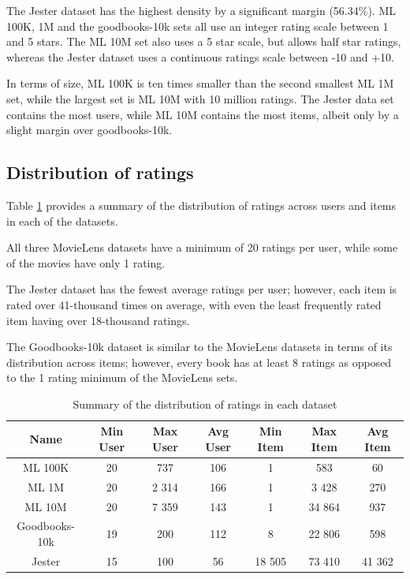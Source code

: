The Jester dataset has the highest density by a significant margin (56.34\%). ML 100K, 1M and the goodbooks-10k sets all use an integer rating scale between 1 and 5 stars. The ML 10M set also uses a 5 star scale, but allows half star ratings, whereas the Jester dataset uses a continuous ratings scale between -10 and +10.

In terms of size, ML 100K is ten times smaller than the second smallest ML 1M set, while the largest set is ML 10M with 10 million ratings. The Jester data set contains the most users, while ML 10M contains the most items, albeit only by a slight margin over goodbooks-10k.

\subsection{Distribution of ratings}
Table \ref{tab:ratings-distribution} provides a summary of the distribution of ratings across users and items in each of the datasets.

All three MovieLens datasets have a minimum of 20 ratings per user, while some of the movies have only 1 rating.

The Jester dataset has the fewest average ratings per user; however, each item is rated over 41-thousand times on average, with even the least frequently rated item having over 18-thousand ratings.

The Goodbooks-10k dataset is similar to the MovieLens datasets in terms of its distribution across items; however, every book has at least 8 ratings as opposed to the 1 rating minimum of the MovieLens sets.

\begin{table}[H]
\label{tab:ratings-distribution}
\centering
\begin{tabular}{c | c | c | c | c | c | c}
\toprule
\textbf{Name} & \textbf{Min User} & \textbf{Max User} & \textbf{Avg User} & \textbf{Min Item} & \textbf{Max Item} & \textbf{Avg Item} \\
\midrule
ML 100K & 20 & 737 & 106 & 1 & 583 & 60 \\
ML 1M & 20 & 2 314 & 166 & 1 & 3 428 & 270 \\
ML 10M & 20 & 7 359 & 143 & 1 & 34 864 & 937 \\
Goodbooks-10k & 19 & 200 & 112 & 8 & 22 806 & 598 \\
Jester & 15 & 100 & 56 & 18 505 & 73 410 & 41 362 \\
\bottomrule
\end{tabular}
\caption[Ratings distribution]{Summary of the distribution of ratings in each dataset}
\end{table}

